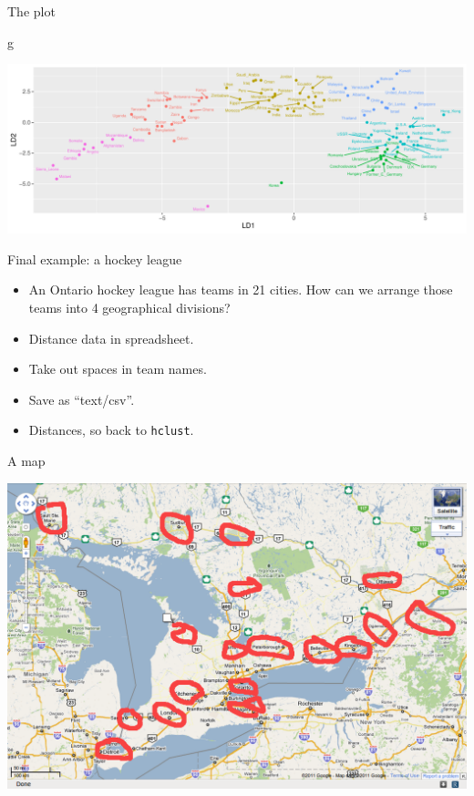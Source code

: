 \documentclass[
  ignorenonframetext,
]{beamer}
\newenvironment{Shaded}{\begin{snugshade}}{\end{snugshade}}
\newcommand{\NormalTok}[1]{#1}
\begin{document}
\begin{frame}[fragile]{The plot}
\protect\hypertarget{the-plot-7}{}

\begin{Shaded}
\begin{Highlighting}[]
\NormalTok{g}
\end{Highlighting}
\end{Shaded}

\includegraphics{slides_d29_files/figure-beamer/unnamed-chunk-416-1.pdf}

\end{frame}

\begin{frame}[fragile]{Final example: a hockey league}
\protect\hypertarget{final-example-a-hockey-league}{}

\begin{itemize}
\item
  An Ontario hockey league has teams in 21 cities. How can we arrange
  those teams into 4 geographical divisions?
\item
  Distance data in spreadsheet.
\item
  Take out spaces in team names.
\item
  Save as ``text/csv''.
\item
  Distances, so back to \texttt{hclust}.
\end{itemize}

\end{frame}

\begin{frame}{A map}
\protect\hypertarget{a-map}{}

\includegraphics{map1.png}

\end{frame}
\end{document}
